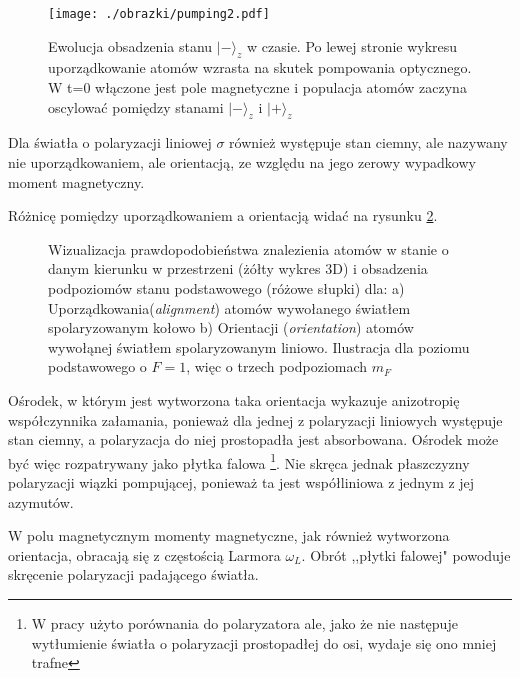 \documentclass[a4paper,10pt]{article}
\begin{document}
\begin{figure}[h!]
\begin{center}
 \texttt{[image: ./obrazki/pumping2.pdf]}
\end{center}
\caption{ Ewolucja obsadzenia stanu $\lvert - \rangle_z$ w czasie. Po lewej stronie wykresu uporządkowanie atomów wzrasta na skutek pompowania optycznego. W t=0 włączone jest pole magnetyczne i populacja atomów zaczyna oscylować pomiędzy stanami $\lvert - \rangle_z$ i $\lvert + \rangle_z$ }
\label{fig:Px-}
\end{figure}



Dla światła o polaryzacji liniowej $\sigma$ również występuje stan ciemny, ale nazywany nie uporządkowaniem, ale orientacją, ze względu na jego zerowy wypadkowy moment magnetyczny.

Różnicę pomiędzy uporządkowaniem a orientacją widać na rysunku \ref{alor}.

\begin{figure}[h!]

\caption{Wizualizacja prawdopodobieństwa znalezienia atomów w stanie o danym kierunku w przestrzeni (żółty wykres 3D) i obsadzenia podpoziomów stanu podstawowego (różowe słupki) dla: a) Uporządkowania(\textit{alignment}) atomów wywołanego światłem spolaryzowanym kołowo b) Orientacji (\textit{orientation}) atomów wywołąnej światłem spolaryzowanym liniowo. Ilustracja dla poziomu podstawowego o $F=1$, więc o trzech podpoziomach $m_F$}
\label{alor}
\end{figure}

Ośrodek, w którym jest wytworzona taka orientacja wykazuje anizotropię współczynnika załamania, ponieważ dla jednej z polaryzacji liniowych występuje stan ciemny, a polaryzacja do niej prostopadła jest absorbowana. Ośrodek może być więc rozpatrywany jako płytka falowa \footnote{W pracy \cite{rotpol} użyto porównania do polaryzatora ale, jako że nie następuje wytłumienie światła o polaryzacji prostopadłej do osi, wydaje się ono mniej trafne}.  Nie skręca jednak płaszczyzny polaryzacji wiązki pompującej, ponieważ ta jest współliniowa z jednym z jej azymutów.

W polu magnetycznym momenty magnetyczne, jak również wytworzona orientacja, obracają się z częstością Larmora $\omega_L$. Obrót ,,płytki falowej" powoduje skręcenie polaryzacji padającego światła.
\end{document}
